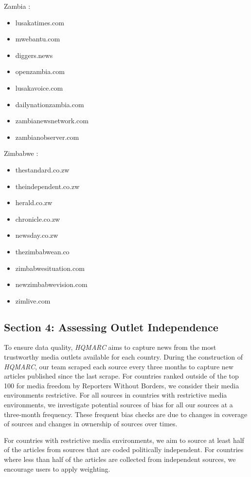 \documentclass[
  letterpaper,
  DIV=11,
  numbers=noendperiod]{scrartcl}
\providecommand{\tightlist}{%
  \setlength{\itemsep}{0pt}\setlength{\parskip}{0pt}}\usepackage{longtable,booktabs,array}
\begin{document}
Zambia :

\begin{itemize}
\tightlist
\item
  lusakatimes.com
\item
  mwebantu.com
\item
  diggers.news
\item
  openzambia.com
\item
  lusakavoice.com
\item
  dailynationzambia.com
\item
  zambianewsnetwork.com
\item
  zambianobserver.com
\end{itemize}

Zimbabwe :

\begin{itemize}
\tightlist
\item
  thestandard.co.zw
\item
  theindependent.co.zw
\item
  herald.co.zw
\item
  chronicle.co.zw
\item
  newsday.co.zw
\item
  thezimbabwean.co
\item
  zimbabwesituation.com
\item
  newzimbabwevision.com
\item
  zimlive.com
\end{itemize}

\subsection{Section 4: Assessing Outlet
Independence}\label{section-4-assessing-outlet-independence}

To ensure data quality, \emph{HQMARC} aims to capture news from the most
trustworthy media outlets available for each country. During the
construction of \emph{HQMARC}, our team scraped each source every three
months to capture new articles published since the last scrape. For
countries ranked outside of the top 100 for media freedom by Reporters
Without Borders, we consider their media environments restrictive. For
all sources in countries with restrictive media environments, we
investigate potential sources of bias for all our sources at a
three-month frequency. These frequent bias checks are due to changes in
coverage of sources and changes in ownership of sources over times.

For countries with restrictive media environments, we aim to source at
least half of the articles from sources that are coded politically
independent. For countries where less than half of the articles are
collected from independent sources, we encourage users to apply
weighting.
\end{document}
